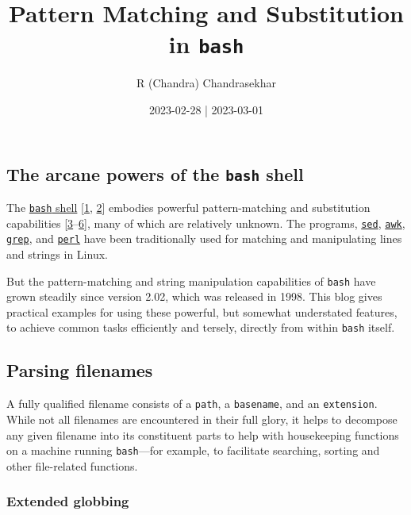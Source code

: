 \documentclass[
  a4paper,
]{article}
\title{Pattern Matching and Substitution in \texttt{bash}}
\author{R (Chandra) Chandrasekhar}
\date{2023-02-28 | 2023-03-01}
\begin{document}
\maketitle

\thispagestyle{empty}


\hypertarget{the-arcane-powers-of-the-bash-shell}{%
\subsection{\texorpdfstring{The arcane powers of the \texttt{bash}
shell}{The arcane powers of the bash shell}}\label{the-arcane-powers-of-the-bash-shell}}

The \href{https://www.gnu.org/software/bash/}{\texttt{bash} shell}
{[}\protect\hyperlink{ref-newham2005}{1},
\protect\hyperlink{ref-ryder2018}{2}{]} embodies powerful
pattern-matching and substitution capabilities
{[}\protect\hyperlink{ref-parametersubs}{3}--\protect\hyperlink{ref-stringops}{6}{]},
many of which are relatively unknown. The programs,
\href{https://www.gnu.org/software/sed/}{\texttt{sed}},
\href{https://www.grymoire.com/Unix/Awk.html}{\texttt{awk}},
\href{https://www.gnu.org/software/grep/manual/grep.html}{\texttt{grep}},
and
\href{https://learnbyexample.github.io/learn_perl_oneliners/line-processing.html}{\texttt{perl}}
have been traditionally used for matching and manipulating lines and
strings in Linux.

But the pattern-matching and string manipulation capabilities of
\texttt{bash} have grown steadily since version 2.02, which was released
in 1998. This blog gives practical examples for using these powerful,
but somewhat understated features, to achieve common tasks efficiently
and tersely, directly from within \texttt{bash} itself.

\hypertarget{parsing-filenames}{%
\subsection{Parsing filenames}\label{parsing-filenames}}

A fully qualified filename consists of a \texttt{path}, a
\texttt{basename}, and an \texttt{extension}. While not all filenames
are encountered in their full glory, it helps to decompose any given
filename into its constituent parts to help with housekeeping functions
on a machine running \texttt{bash}---for example, to facilitate
searching, sorting and other file-related functions.

\hypertarget{extended-globbing}{%
\subsubsection{Extended globbing}\label{extended-globbing}}
\end{document}
